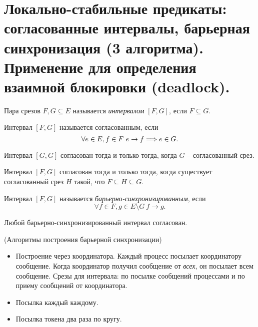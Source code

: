 \section{Локально-стабильные предикаты: согласованные интервалы, барьерная 
синхронизация (3 алгоритма). Применение для определения взаимной блокировки 
(deadlock).}

\begin{definition}
    Пара срезов $F, G \subseteq E$ называется \textit{интервалом} $[F, G]$,
    если $F \subseteq G$.
\end{definition}

\begin{definition}
    Интервал $[F, G]$ называется согласованным, если
    \[
        \forall e \in E, f \in F~ e \to f \Longrightarrow e \in G
    .\]
\end{definition}

\begin{remark}
    Интервал $[G, G]$ согласован тогда и только тогда, когда $G$ -- согласованный
    срез.
\end{remark}

\begin{theorem}
    Интервал $[F, G]$ согласован тогда и только тогда, когда существует согласованный
    срез $H$ такой, что $F \subseteq H \subseteq G$.
\end{theorem}

\begin{definition}
    Интервал $[F, G]$ называется \textit{барьерно-синхронизированным}, если
    \[
        \forall f \in F, g \in E \setminus G~ f \to g
    .\]
\end{definition}

\begin{theorem}
    Любой барьерно-синхронизированный интервал согласован.
\end{theorem}

\begin{algorithm}(Алгоритмы построения барьерной синхронизации)
    \enewline
    \begin{itemize}
        \item Построение через координатора. Каждый процесс посылает
            координатору сообщение. Когда координатор получил сообщение
            от \textit{всех}, он посылает всем сообщение. Срезы для интервала:
            по посылке сообщений процессами и по приему сообщений от координатора.
        \item Посылка каждый каждому.
        \item Посылка токена два раза по кругу.
    \end{itemize}
\end{algorithm}

